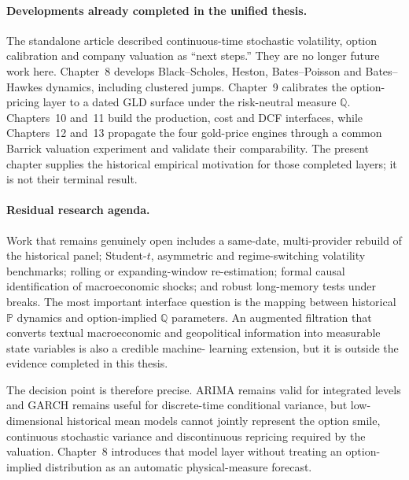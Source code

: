\paragraph{Developments already completed in the unified thesis.}
The standalone article described continuous-time stochastic volatility,
option calibration and company valuation as ``next steps.'' They are no
longer future work here. Chapter~8 develops Black--Scholes, Heston,
Bates--Poisson and Bates--Hawkes dynamics, including clustered jumps.
Chapter~9 calibrates the option-pricing layer to a dated GLD surface under the
risk-neutral measure $\mathbb Q$. Chapters~10 and~11 build the production,
cost and DCF interfaces, while Chapters~12 and~13 propagate the four gold-price
engines through a common Barrick valuation experiment and validate their
comparability. The present chapter supplies the historical empirical
motivation for those completed layers; it is not their terminal result.

\paragraph{Residual research agenda.}
Work that remains genuinely open includes a same-date, multi-provider rebuild
of the historical panel; Student-$t$, asymmetric and regime-switching
volatility benchmarks; rolling or expanding-window re-estimation; formal
causal identification of macroeconomic shocks; and robust long-memory tests
under breaks. The most important interface question is the mapping between
historical $\mathbb P$ dynamics and option-implied $\mathbb Q$ parameters.
An augmented filtration that converts textual macroeconomic and geopolitical
information into measurable state variables is also a credible machine-
learning extension, but it is outside the evidence completed in this thesis.

The decision point is therefore precise. ARIMA remains valid for integrated
levels and GARCH remains useful for discrete-time conditional variance, but
low-dimensional historical mean models cannot jointly represent the option
smile, continuous stochastic variance and discontinuous repricing required by
the valuation. Chapter~8 introduces that model layer without treating an
option-implied distribution as an automatic physical-measure forecast.
